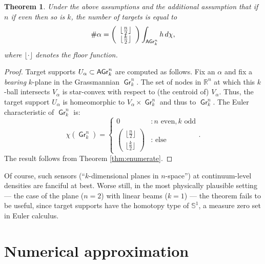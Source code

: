 \documentclass{psapm-l}
\newtheorem{theorem}{Theorem}[section]
\theoremstyle{definition}
\theoremstyle{remark}
\numberwithin{equation}{section}
\begin{document}
\begin{theorem}
\label{thm:beam}
Under the above assumptions and the additional assumption that if $n$ if even then so is $k$, the number of targets is equal to
\begin{equation}
\label{eq:grass}
\#\alpha =
   \left(
    \begin{array}{c}
            \lfloor\frac{n}{2}\rfloor
            \\
            \lfloor\frac{k}{2}\rfloor
    \end{array}
    \right)
    \int_{{{\sf AGr}}_k^n}h\,d\chi   ,
\end{equation}
where $\lfloor\cdot\rfloor$ denotes the floor function.
\end{theorem}
\begin{proof}
Target supports $U_\alpha\subset{{\sf AGr}}_k^n$ are computed as follows. Fix an $\alpha$ and fix a {\em bearing} $k$-plane in the Grassmannian ${{{\operatorname{\mathsf{{Gr}}}}}}_k^n$. The set of nodes in ${{\mathbb R}}^n$ at which this $k$-ball intersects $V_\alpha$ is star-convex with respect to (the centroid of) $V_\alpha$. Thus, the target support $U_\alpha$ is homeomorphic to $V_\alpha\times{{{\operatorname{\mathsf{{Gr}}}}}}_k^n$ and thus to ${{{\operatorname{\mathsf{{Gr}}}}}}_k^n$. The Euler characteristic of ${{{\operatorname{\mathsf{{Gr}}}}}}_k^n$ is:
\[
    \chi({{{\operatorname{\mathsf{{Gr}}}}}}_k^n) = \left\{
    \begin{array}{cl}
    0 & : n {\mbox{ even}}, k {\mbox{ odd}}
    \\
   \left(
    \begin{array}{c}
            \lfloor\frac{n}{2}\rfloor
            \\
            \lfloor\frac{k}{2}\rfloor
    \end{array}
    \right)
    & : {\mbox{ else}}
    \end{array}
    \right.  .
\]
The result follows from Theorem \ref{thm:enumerate}.
\end{proof}

Of course, such sensors (``$k$-dimensional planes in $n$-space'') at continuum-level densities are fanciful at best. Worse still, in the most physically plausible setting --- the case of the plane ($n=2$) with linear beams ($k=1$) --- the theorem fails to be useful, since target supports have the homotopy type of ${{\mathbb S}}^1$, a measure zero set in Euler calculus.

\section{Numerical approximation}
\label{sec:numerical}
\end{document}

